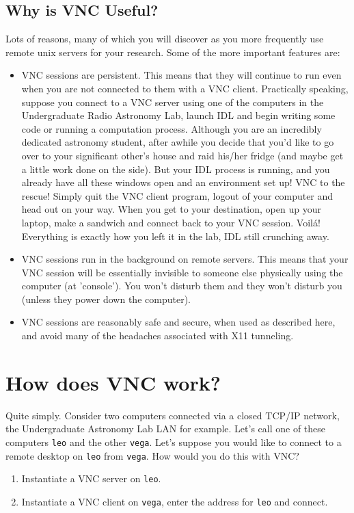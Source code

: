 \documentclass[11pt,preprint]{aastex}
\begin{document}
\subsection{Why is VNC Useful?}
Lots of reasons, many of which you will discover as you more frequently use remote unix servers for your research.  Some of the more important features are:
 \begin{itemize}
\item VNC sessions are persistent.  This means that they will continue to run even when you are not connected to them with a VNC client.  Practically speaking, 
suppose you connect to a VNC server using one of the computers in the Undergraduate Radio Astronomy Lab, launch IDL and begin writing some code or running a 
computation process.  Although you are an incredibly dedicated astronomy student, after awhile you decide that you'd like to go over to your significant other's house
and raid his/her fridge (and maybe get a little work done on the side).  But your IDL process is running, and you already have all these windows open and an environment set up!
VNC to the rescue!  Simply quit the VNC client program, logout of your computer and head out on your way.  When you get to your destination, open up your laptop, make a sandwich and
connect back to your VNC session.  Voil\'{a}!  Everything is exactly how you left it in the lab, IDL still crunching away. 

\item VNC sessions run in the background on remote servers.  This means that your VNC session will be essentially invisible to someone
else physically using the computer (at 'console').  You won't disturb them and they won't disturb you (unless they power down the computer). 

\item VNC sessions are reasonably safe and secure, when used as described here, and avoid many of the headaches associated with X11 tunneling.
\end{itemize}

\section{How does VNC work?}
Quite simply.  Consider two computers connected via a closed TCP/IP network, the Undergraduate Astronomy Lab LAN for example.  Let's call one of these computers
\verb$leo$ and the other \verb$vega$.  Let's suppose you would like to connect to a remote desktop on \verb$leo$ from \verb$vega$.  How would you do this with VNC?
\begin{enumerate}
\item Instantiate a VNC server on \verb$leo$.
\item Instantiate a VNC client on \verb$vega$, enter the address for \verb$leo$ and connect.
\end{enumerate}
\end{document}

